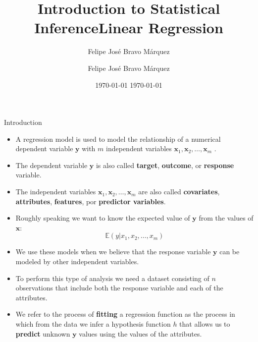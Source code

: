 \documentclass[handout]{beamer}
\title{Introduction to Statistical Inference}
\author[Felipe Bravo Márquez]{\footnotesize
 \textcolor[rgb]{0.00,0.00,1.00}{Felipe José Bravo Márquez}}
\date{ \today }
\title{Linear Regression}
\author[Felipe Bravo Márquez]{\footnotesize
 \textcolor[rgb]{0.00,0.00,1.00}{Felipe José Bravo Márquez}}
\date{ \today }
\begin{document}
\begin{frame}
\titlepage


\end{frame}





\begin{frame}{Introduction}
\scriptsize{
\begin{itemize}

 \item  A regression model is used to model the relationship of a numerical dependent variable $\mathbf{y}$ with $m$ independent variables  $\mathbf{x}_1, \mathbf{x}_2, \dots, \mathbf{x}_m$ \cite{wasserman2013all}. 
 
 \item The dependent variable $\mathbf{y}$ is also called \textbf{target}, \textbf{outcome}, or \textbf{response} variable.
 
 \item The independent variables  $\mathbf{x}_1, \mathbf{x}_2, \dots, \mathbf{x}_m$ are also called \textbf{covariates}, \textbf{attributes}, \textbf{features}, por \textbf{predictor variables}.
 
 
 \item  Roughly speaking we want to know the expected value of $\mathbf{y}$ from the values of $\mathbf{x}$:
 \begin{displaymath}
 \mathbb{E}(y|x_1,x_2,\dots,x_m)
 \end{displaymath}

 
 \item  We use these models when we believe that the response variable $\mathbf{y}$ can be modeled by other independent variables.
 
 \item To perform this type of analysis we need a dataset consisting of $n$ observations that include both the response variable and each of the attributes.
 
 \item We refer to the process of \textbf{fitting} a regression function as the process in which from the data we infer a hypothesis function $h$ that allows us to \textbf{predict} unknown $\mathbf{y}$ values using the values of the attributes.

 
\end{itemize}



} 
 
\end{frame}
\end{document}
